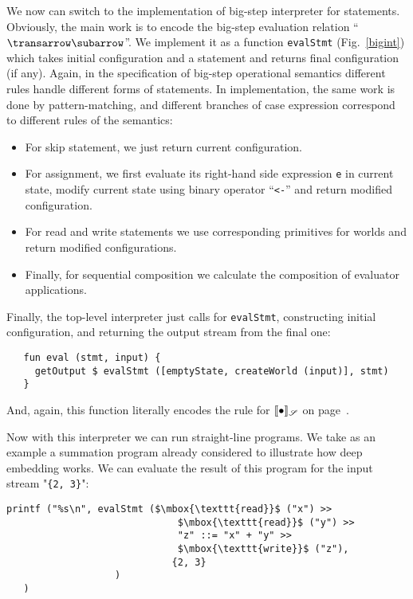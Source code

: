 We now can switch to the implementation of big-step interpreter for statements. Obviously, the main work is to encode the big-step evaluation
relation ``$\transrel$''. We implement it as a function \lstinline|evalStmt| (Fig.~\ref{bigint}) which takes initial configuration and a statement
and returns final configuration (if any). Again, in the specification of big-step operational semantics different rules handle different
forms of statements. In implementation, the same work is done by pattern-matching, and different branches of case expression correspond to
different rules of the semantics:

\begin{itemize}
\item For skip statement, we just return current configuration.
\item For assignment, we first evaluate its right-hand side expression \lstinline|e| in current state, modify current state using binary
  operator ``\lstinline|<-|'' and return modified configuration.
\item For read and write statements we use corresponding primitives for worlds and return modified configurations.
\item Finally, for sequential composition we calculate the composition of evaluator applications.
\end{itemize}

Finally, the top-level interpreter just calls for \lstinline|evalStmt|, constructing initial configuration, and returning
the output stream from the final one:

\begin{lstlisting}
   fun eval (stmt, input) {
     getOutput $ evalStmt ([emptyState, createWorld (input)], stmt) 
   }
\end{lstlisting}

And, again, this function literally encodes the rule for $\llbracket{\bullet}\rrbracket_{\mathscr{S}}$ on page~\pageref{surface-semantics}.

Now with this interpreter we can run straight-line programs. We take as an example a summation program already considered
to illustrate how deep embedding works. We can evaluate the result of this program for the input stream "\lstinline|{2, 3}|":

\begin{lstlisting}[mathescape=true]
   printf ("%s\n", evalStmt ($\mbox{\texttt{read}}$ ("x") >>
                              $\mbox{\texttt{read}}$ ("y") >>
                              "z" ::= "x" + "y" >>
                              $\mbox{\texttt{write}}$ ("z"),
                             {2, 3}
                   )
   )
\end{lstlisting}

